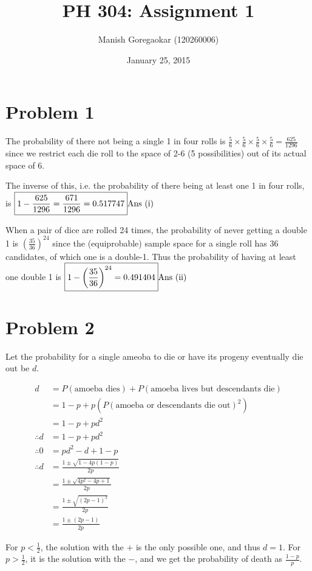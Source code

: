\documentclass[12pt]{article}
\title{PH 304: Assignment 1}
\author{Manish Goregaokar (120260006)}
\date{January 25, 2015}
\begin{document}
\maketitle
\section*{Problem 1}

The probability of there not being a single 1 in four rolls is $\frac56\times\frac56\times\frac56\times\frac56 = \frac{625}{1296}$ since we restrict each die roll to the space of 2-6 (5 possibilities) out of its actual space of 6.

The inverse of this, i.e. the probability of there being at least one 1 in four rolls, is  $\boxed{1 - \frac{625}{1296} = \frac{671}{1296} = 0.517747}\hfill \text{Ans (i)}$

When a pair of dice are rolled 24 times, the probability of never getting a double 1 is $\left(\frac{35}{36}\right)^{24}$ since the (equiprobable) sample space for a single roll has 36 candidates, of which  one is a double-1. Thus the probability of having at least one double 1 is $\boxed{1-\left(\frac{35}{36}\right)^{24} = 0.491404}\hfill\text{Ans (ii)}$
\section*{Problem 2}
Let the probability for a single ameoba to die or have its progeny eventually die out be $d$.

\begin{align*}
d & = P(\text{amoeba dies}) + P(\text{amoeba lives but descendants die})\\
&= 1-p + p(P(\text{amoeba or descendants die out})^2)\\
&= 1-p + pd^2\\
\therefore d &= 1-p + pd^2\\
\therefore 0 &=pd^2 -d +1-p\\
\therefore d &= \frac{1\pm \sqrt{1-4p(1-p)}}{2p}\\
 &= \frac{1\pm \sqrt{4p^2 - 4p + 1}}{2p}\\
  &= \frac{1\pm \sqrt{(2p - 1)^2}}{2p}\\
  &= \frac{1\pm (2p -1)}{2p}
\end{align*}

For $p<\frac12$, the solution with the $+$ is the only possible one, and thus $d=1$. For $p>\frac12$, it is the solution with the $-$, and we get the probability of death as $\frac{1-p}{p}$.
\end{document}
